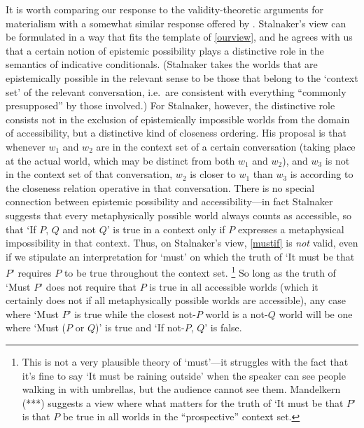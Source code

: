 \documentclass[If.tex]{subfiles}
\begin{document}
It is worth comparing our response to the validity-theoretic arguments for materialism with a somewhat similar response offered by \citet{StalnakerIC}.  Stalnaker's view can be formulated in a way that fits the template of \ref{ourview}, and he agrees with us that a certain notion of epistemic possibility plays a distinctive role in the semantics of indicative conditionals.  (Stalnaker takes the worlds that are epistemically possible in the relevant sense to be those that belong to the ‘context set’ of the relevant conversation, i.e.\ are consistent with everything “commonly presupposed” by those involved.)  For Stalnaker, however, the distinctive role consists not in the exclusion of epistemically impossible worlds from the domain of accessibility, but a distinctive kind of closeness ordering.  His proposal is that whenever $w_1$ and $w_2$ are in the context set of a certain conversation (taking place at the actual world, which may be distinct from both $w_1$ and $w_2$), and $w_3$ is not in the context set of that conversation, $w_2$ is closer to $w_1$ than $w_3$ is according to the closeness relation operative in that conversation.  There is no special connection between epistemic possibility and accessibility---in fact Stalnaker suggests that every metaphysically possible world always counts as accessible, so that ‘If $P$, $Q$ and not $Q$’ is true in a context only if $P$ expresses a metaphysical impossibility in that context.  Thus, on Stalnaker's view, \ref{mustif} is \emph{not} valid, even if we stipulate an interpretation for ‘must’ on which the truth of ‘It must be that $P$’ requires $P$ to be true throughout the context set.%
\footnote{This is not a very plausible theory of ‘must’---it struggles with the fact that it's fine to say ‘It must be raining outside’ when the speaker can see people walking in with umbrellas, but the audience cannot see them.  Mandelkern (***) suggests a view where what matters for the truth of ‘It must be that $P$’ is that $P$ be true in all worlds in the “prospective” context set.}  
So long as the truth of ‘Must $P$’ does not require that $P$ is true in all accessible worlds (which it certainly does not if all metaphysically possible worlds are accessible), any case where ‘Must $P$’ is true while the closest not-$P$ world is a not-$Q$ world will be one where ‘Must ($P$ or $Q$)’ is true and ‘If not-$P$, $Q$’ is false.
\end{document}
